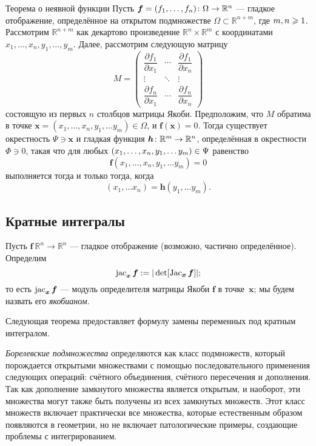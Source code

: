 \begin{thm}{Теорема о неявной функции}\label{thm:imlicit}
Пусть $\bm{f}=(f_1,\dots,f_n)\:\Omega\z\to\mathbb{R}^n$ --- гладкое отображение, определённое на открытом подмножестве $\Omega\subset\mathbb{R}^{n+m}$, где
$m,n\z\ge 1$.
Рассмотрим $\mathbb{R}^{n+m}$ как декартово произведение $\mathbb{R}^n\times \mathbb{R}^m$ с координатами 
$x_1,\dots,x_n,y_1,\dots,y_m$.
Далее, рассмотрим следующую матрицу
\[
M=\begin{pmatrix}
\dfrac{\partial f_1}{\partial x_1} & \cdots & \dfrac{\partial f_1}{\partial x_n}\\
\vdots & \ddots & \vdots\\
\dfrac{\partial f_n}{\partial x_1} & \cdots & \dfrac{\partial f_n}{\partial x_n} \end{pmatrix}\]
состоящую из первых $n$ столбцов матрицы Якоби.
Предположим, что $M$ обратима в точке $\bm{x}=(x_1,\dots,x_n,y_1,\dots y_m)\in \Omega$, и $\bm{f}(\bm{x})=0$.
Тогда существует окрестность $\Psi\ni \bm{x}$
и гладкая функция $\bm{h}\:\mathbb{R}^m\z\to\mathbb{R}^n$, определённая в окрестности $\Phi\ni 0$, такая что
для любых $(x_1,\dots,x_n,y_1,\dots y_m)\z\in \Psi$ равенство
\[\bm{f}(x_1,\dots,x_n,y_1,\dots y_m)=0\]
выполняется тогда и только тогда, когда
\[(x_1,\dots x_n)=\bm{h}(y_1,\dots y_m).\]

\end{thm}

\subsection*{Кратные интегралы}

Пусть $\bm{f}\:\mathbb{R}^n\to\mathbb{R}^n$ --- гладкое отображение (возможно, частично определённое).
Определим
\[\jac_{\bm{x}}\bm{f}\df|\det[\Jac_{\bm{x}}\bm{f}]|;
\index{10j@$\jac$ (определитель Якоби)}\]
то есть $\mathop{\rm jac}\nolimits_{\bm{x}}\bm{f}$ --- модуль определителя матрицы Якоби $\bm{f}$ в точке~$\bm{x}$;
мы будем назвать его \emph{якобианом}.

Следующая теорема предоставляет формулу замены переменных под кратным интегралом.

\emph{Борелевские подмножества} определяются как класс подмножеств, который порождается открытыми множествами с помощью последовательного применения следующих операций: счётного объединения, счётного пересечения и дополнения.
Так как дополнение замкнутого множества является открытым, и наоборот, эти множества могут также быть получены из всех замкнутых множеств.
Этот класс множеств включает практически все множества, которые естественным образом появляются в геометрии, но не включает патологические примеры, создающие проблемы с интегрированием.

